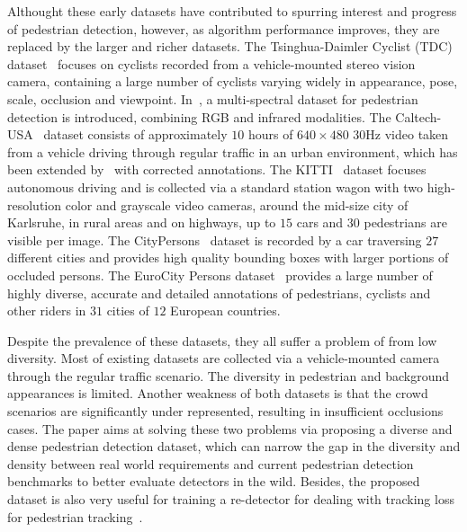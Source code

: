 \documentclass[journal]{IEEEtran}
\begin{document}
Althought these early datasets have contributed to spurring interest and progress of pedestrian detection, however, as algorithm performance improves, they are replaced by the larger and richer datasets. The Tsinghua-Daimler Cyclist (TDC) dataset~\cite{DBLP:conf/ivs/LiFYXBPLG16} focuses on cyclists recorded from a vehicle-mounted stereo vision camera, containing a large number of cyclists varying widely in appearance, pose, scale, occlusion and viewpoint. In~\cite{DBLP:conf/cvpr/HwangPKCK15}, a multi-spectral dataset for pedestrian detection is introduced, combining RGB and infrared modalities. The Caltech-USA~\cite{DBLP:journals/pami/DollarWSP12} dataset consists of approximately $10$ hours of $640\times480$ $30$Hz video taken from a vehicle driving through regular traffic in an urban environment, which has been extended by~\cite{DBLP:journals/pami/ZhangBOHS18} with corrected annotations. The KITTI~\cite{DBLP:conf/cvpr/GeigerLU12} dataset focuses autonomous driving and is collected via a standard station wagon with two high-resolution color and grayscale video cameras, around the mid-size city of Karlsruhe, in rural areas and on highways, up to $15$ cars and $30$ pedestrians are visible per image. The CityPersons~\cite{DBLP:conf/cvpr/ZhangBS17} dataset is recorded by a car traversing $27$ different cities and provides high quality bounding boxes with larger portions of occluded persons. The EuroCity Persons dataset~\cite{DBLP:journals/corr/abs-1805-07193} provides a large number of highly diverse, accurate and detailed annotations of pedestrians, cyclists and other riders in $31$ cities of $12$ European countries.

Despite the prevalence of these datasets, they all suffer a problem of from low diversity. Most of existing datasets are collected via a vehicle-mounted camera through the regular traffic scenario. The diversity in pedestrian and background appearances is limited. Another weakness of both datasets is that the crowd scenarios are significantly under represented, resulting in insufficient occlusions cases. The paper aims at solving these two problems via proposing a diverse and dense pedestrian detection dataset, which can narrow the gap in the diversity and density between real world requirements and current pedestrian detection benchmarks to better evaluate detectors in the wild. Besides, the proposed dataset is also very useful for training a re-detector for dealing with tracking loss for pedestrian tracking~\cite{DBLP:journals/tip/SundaresanC09, DBLP:journals/tip/LanZYC18}.
\end{document}
